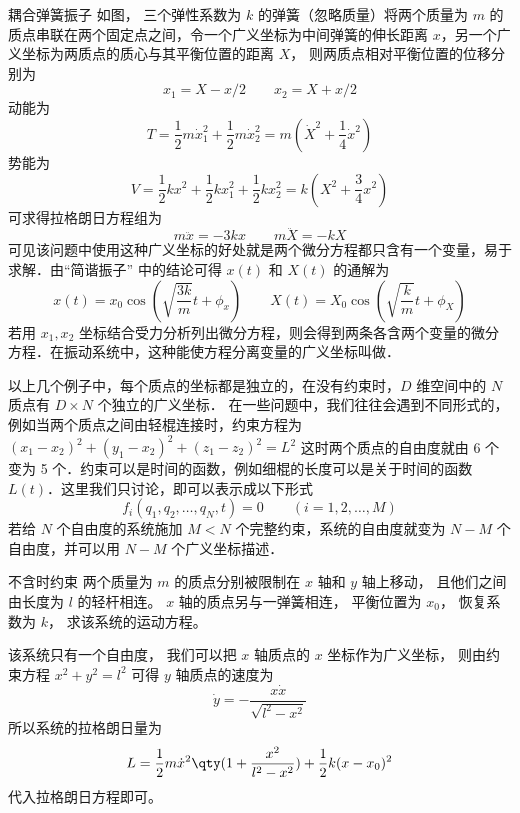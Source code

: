 \begin{exam}{耦合弹簧振子}
如图，%
三个弹性系数为 $k$ 的弹簧（忽略质量）将两个质量为 $m$ 的质点串联在两个固定点之间，令一个广义坐标为中间弹簧的伸长距离 $x$，另一个广义坐标为两质点的质心与其平衡位置的距离 $X$， 则两质点相对平衡位置的位移分别为
\begin{equation}
x_1=X-x/2 \qquad x_2 = X+x/2
\end{equation}
动能为
\begin{equation}
T=\frac{1}{2}m\dot x_1^2 + \frac{1}{2}m\dot x_2^2 = m\left( {{{\dot X}^2} + \frac{1}{4}{{\dot x}^2}} \right)
\end{equation}
势能为
\begin{equation}
V = \frac{1}{2}k{x^2} + \frac{1}{2}kx_1^2 + \frac{1}{2}kx_2^2 = k\left( X^2 + \frac 34 x^2 \right)
\end{equation}
可求得拉格朗日方程组为
\begin{equation}
m\ddot x =  - 3kx \qquad m\ddot X =  - kX
\end{equation}
可见该问题中使用这种广义坐标的好处就是两个微分方程都只含有一个变量，易于求解．由“简谐振子” 中的结论可得 $x(t)$ 和 $X(t)$ 的通解为
\begin{equation}
x(t) = {x_0}\cos \left( {\sqrt {\frac{3k}{m}} t + {\phi_x}} \right)
\qquad
X(t) = {X_0}\cos \left( {\sqrt {\frac{k}{m}} t + {\phi_X}} \right)
\end{equation}
若用 $x_1, x_2$ 坐标结合受力分析列出微分方程，则会得到两条各含两个变量的微分方程．在振动系统中，这种能使方程分离变量的广义坐标叫做．%
\end{exam}
\phantom{=}

以上几个例子中，每个质点的坐标都是独立的，在没有约束时，$D$ 维空间中的 $N$ 质点有 $D\times N$ 个独立的广义坐标． 在一些问题中，我们往往会遇到不同形式的，例如当两个质点之间由轻棍连接时，约束方程为 $(x_1-x_2)^2+(y_1-x_2)^2+(z_1-z_2)^2=L^2$ 这时两个质点的自由度就由 6 个变为 5 个．约束可以是时间的函数，例如细棍的长度可以是关于时间的函数 $L(t)$．这里我们只讨论，即可以表示成以下形式
\begin{equation}
f_i(q_1,q_2,\dots ,q_N,t) = 0 \qquad (i = 1,2,\dots,M)
\end{equation}
若给 $N$ 个自由度的系统施加 $M<N$ 个完整约束，系统的自由度就变为 $N-M$ 个自由度，并可以用 $N-M$ 个广义坐标描述．

\begin{exam}{不含时约束}
两个质量为 $m$ 的质点分别被限制在 $x$ 轴和 $y$ 轴上移动， 且他们之间由长度为 $l$ 的轻杆相连。 $x$ 轴的质点另与一弹簧相连， 平衡位置为 $x_0$， 恢复系数为 $k$， 求该系统的运动方程。

该系统只有一个自由度， 我们可以把 $x$ 轴质点的 $x$ 坐标作为广义坐标， 则由约束方程 $x^2 + y^2 = l^2$ 可得 $y$ 轴质点的速度为
\begin{equation}
\dot y = -\frac{x\dot x}{\sqrt{l^2 - x^2}}
\end{equation}
所以系统的拉格朗日量为
\begin{equation}
L = \frac 12 m \dot x^2\qty(1 + \frac{x^2}{l^2 - x^2}) + \frac 12 k (x-x_0)^2
\end{equation}
代入拉格朗日方程即可。
\end{exam}

